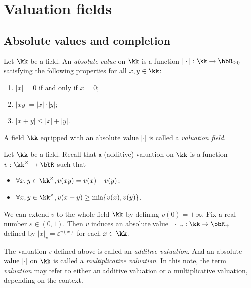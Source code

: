 \section{Valuation fields}

\subsection{Absolute values and completion}

    \begin{definition}\label{def:valuation_field}
        Let \(\kk\) be a field.
        An \emph{absolute value} on \(\kk\) is a function \(|\cdot|:\kk\to\bbR_{\ge0}\) satisfying the following properties for all \(x,y\in\kk\):
        \begin{enumerate}
            \item \(|x|=0\) if and only if \(x=0\);
            \item \(|xy|=|x|\cdot|y|\);
            \item \(|x+y|\leq|x|+|y|\).
        \end{enumerate}
        A field \(\kk\) equipped with an absolute value \(|\cdot|\) is called a \emph{valuation field}.
    \end{definition}

    \begin{remark}\label{rmk:additive_and_multiplicative_valuation_on_a_field}
        Let \(\kk\) be a field.
        Recall that a (additive) valuation on \(\kk\) is a function \(v: \kk^\times \to \bbR\) such that
        \begin{itemize}
            \item \(\forall x,y \in \kk^\times, v(xy) = v(x) + v(y)\);
            \item \(\forall x,y \in \kk^\times, v(x + y) \geq \min\{v(x), v(y)\}\).
        \end{itemize}
        We can extend \(v\) to the whole field \(\kk\) by defining \(v(0) = +\infty\).
        Fix a real number \(\varepsilon \in (0,1)\).
        Then \(v\) induces an absolute value \(|\cdot|_v: \kk \to \bbR_+\) defined by \(|x|_v = \varepsilon^{v(x)}\) for each \(x \in \kk\).

        The valuation \(v\) defined above is called an \emph{additive valuation}.
        And an absolute value \(|\cdot|\) on \(\kk\) is called a \emph{multiplicative valuation}.
        In this note, the term \emph{valuation} may refer to either an additive valuation or a multiplicative valuation, depending on the context.
    \end{remark}

